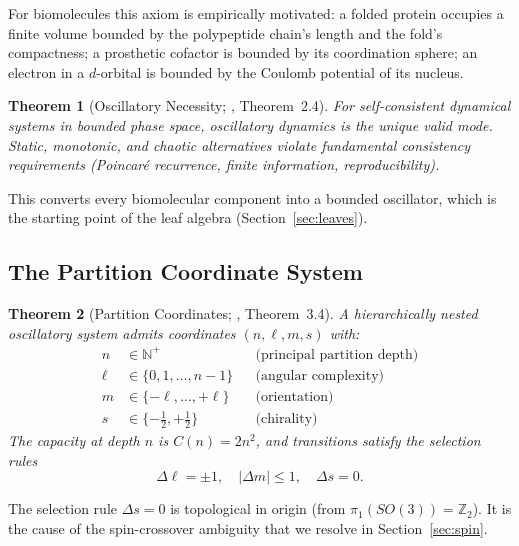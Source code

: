 \documentclass[11pt,twocolumn,a4paper]{article}
\newtheorem{theorem}{Theorem}[section]
\theoremstyle{definition}
\theoremstyle{remark}
\newcommand{\Z}{\mathbb{Z}}
\newcommand{\N}{\mathbb{N}}
\begin{document}
For biomolecules this axiom is empirically motivated: a folded protein occupies a finite volume bounded by the polypeptide chain's length and the fold's compactness; a prosthetic cofactor is bounded by its coordination sphere; an electron in a $d$-orbital is bounded by the Coulomb potential of its nucleus.

\begin{theorem}[Oscillatory Necessity; \citealt{sachikonye2025spec}, Theorem~2.4]
\label{thm:osc_nec}
For self-consistent dynamical systems in bounded phase space, oscillatory dynamics is the unique valid mode. Static, monotonic, and chaotic alternatives violate fundamental consistency requirements (Poincar\'e recurrence, finite information, reproducibility).
\end{theorem}

This converts every biomolecular component into a bounded oscillator, which is the starting point of the leaf algebra (Section~\ref{sec:leaves}).

\subsection{The Partition Coordinate System}

\begin{theorem}[Partition Coordinates; \citealt{sachikonye2025spec}, Theorem~3.4]
\label{thm:partition_coords}
A hierarchically nested oscillatory system admits coordinates $(n, \ell, m, s)$ with:
\begin{align}
n &\in \N^+ && \text{(principal partition depth)} \\
\ell &\in \{0, 1, \ldots, n-1\} && \text{(angular complexity)} \\
m &\in \{-\ell, \ldots, +\ell\} && \text{(orientation)} \\
s &\in \{-\tfrac{1}{2}, +\tfrac{1}{2}\} && \text{(chirality)}
\end{align}
The capacity at depth $n$ is $C(n) = 2n^2$, and transitions satisfy the selection rules
\begin{equation}
\Delta\ell = \pm 1, \quad |\Delta m| \leq 1, \quad \Delta s = 0.
\label{eq:selection_rules}
\end{equation}
\end{theorem}

The selection rule $\Delta s = 0$ is topological in origin (from $\pi_1(SO(3)) = \Z_2$). It is the cause of the spin-crossover ambiguity that we resolve in Section~\ref{sec:spin}.
\end{document}
